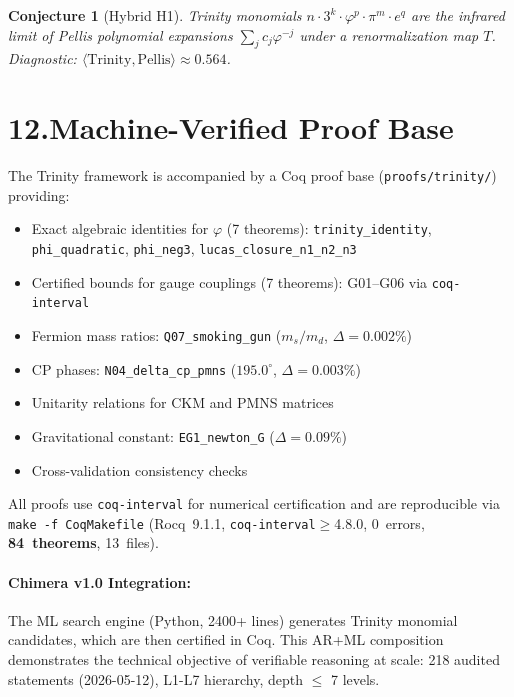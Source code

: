 \documentclass[12pt,a4paper]{article}
\newcommand{\ph}{\varphi}
\newtheorem{conjecture}{Conjecture}
\begin{document}
\begin{conjecture}[Hybrid H1]
Trinity monomials $n\cdot3^k\cdot\ph^p\cdot\pi^m\cdot e^q$ are the infrared
limit of Pellis polynomial expansions $\sum_j c_j\ph^{-j}$ under a
renormalization map $T$.
Diagnostic: $\langle\text{Trinity},\text{Pellis}\rangle\approx0.564$.
\end{conjecture}

\section*{12.\quad Machine-Verified Proof Base}

\noindent
The Trinity framework is accompanied by a Coq proof base
(\texttt{proofs/trinity/}) providing:

\begin{itemize}
  \item Exact algebraic identities for $\ph$ (7 theorems):
    \texttt{trinity\_identity}, \texttt{phi\_quadratic},
    \texttt{phi\_neg3}, \texttt{lucas\_closure\_n1\_n2\_n3}
  \item Certified bounds for gauge couplings (7 theorems):
    G01--G06 via \texttt{coq-interval}
  \item Fermion mass ratios: \texttt{Q07\_smoking\_gun}
    ($m_s/m_d$, $\Delta=0.002\%$)
  \item CP phases: \texttt{N04\_delta\_cp\_pmns} ($195.0^\circ$, $\Delta=0.003\%$)
  \item Unitarity relations for CKM and PMNS matrices
  \item Gravitational constant: \texttt{EG1\_newton\_G} ($\Delta=0.09\%$)
  \item Cross-validation consistency checks
\end{itemize}

All proofs use \texttt{coq-interval} for numerical certification and are
reproducible via \texttt{make -f CoqMakefile} (Rocq~9.1.1,
\texttt{coq-interval}$\ge$4.8.0, 0~errors, \textbf{84~theorems}, 13~files).

\paragraph{Chimera v1.0 Integration:}
The ML search engine (Python, 2400+ lines) generates Trinity monomial
candidates, which are then certified in Coq. This AR+ML composition
demonstrates the technical objective of verifiable reasoning
at scale: 218 audited statements (2026-05-12), L1-L7 hierarchy, depth $\le$ 7 levels.
\end{document}
